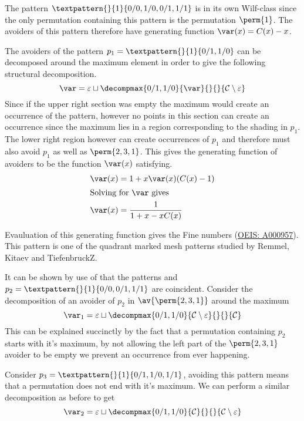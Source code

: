 The pattern \(\textpattern{}{1}{0/0,1/0,0/1,1/1}\) is in its own
Wilf-class since the only permutation containing this pattern is
the permutation \(\perm{1}\). The avoiders of this pattern therefore
have generating function \(\var(x) = C(x)-x\).\nextvar

The avoiders of the pattern \(p_1 = \textpattern{}{1}{0/1,1/0}\) can be
decomposed around the maximum element in order to give the following
structural decomposition.
\begin{equation*}
    \mathcal{\var} = \varepsilon \sqcup \decompmax{0/1,1/0}{\mathcal{\var}}{}{}{\mathcal{C}\setminus\varepsilon}
\end{equation*}
Since if the upper right section was empty the maximum would create an
occurrence of the pattern, however no points in this section can create
an occurrence since the maximum lies in a region corresponding to the
shading in \(p_1\). The lower right region however can create occurrences
of \(p_1\) and therefore must also avoid \(p_1\) as well as \(\perm{2,3,1}\).
This gives the generating function of avoiders to be the function \(\var(x)\)
satisfying.
\begin{align*}
    \var(x) &= 1 + x\var(x)(C(x)-1) \\
    \shortintertext{Solving for \(\var\) gives}
    \var(x) &= \frac{1}{1+x-xC(x)}
\end{align*}

Evauluation of this generating function gives the Fine numbers
(\href{https://oeis.org/A000957}{OEIS: A000957}). This pattern is one of the
quadrant marked mesh patterns studied by Remmel, Kitaev and TiefenbruckZ\cite{2012arXiv1201.6243K}.

It can be shown by use of  that the patterns
 and \(p_2 = \textpattern{}{1}{0/0,0/1,1/1}\) are
coincident. Consider the decomposition of an avoider of \(p_2\) in
\(\av{\perm{2,3,1}}\) around the maximum\nextvar[\varullr]
\begin{equation*}
    \mathcal{\var}_1 =\varepsilon \sqcup \decompmax{0/1,1/0}{\mathcal{C}\setminus\varepsilon}{}{}{\mathcal{C}}
\end{equation*}
This can be explained succinctly by the fact that a permutation containing
\(p_2\) starts with it's maximum, by not allowing the left part of the
\(\perm{2,3,1}\) avoider to be empty we prevent an occurrence from ever happening.

Consider \(p_3 = \textpattern{}{1}{0/1,1/0,1/1}\), avoiding this pattern
means that a permutation does not end with it's maximum. We can perform a similar
decomposition as before to get
\begin{equation*}
    \mathcal{\var}_2 =\varepsilon \sqcup \decompmax{0/1,1/0}{\mathcal{C}}{}{}{\mathcal{C}\setminus\varepsilon}
\end{equation*}

